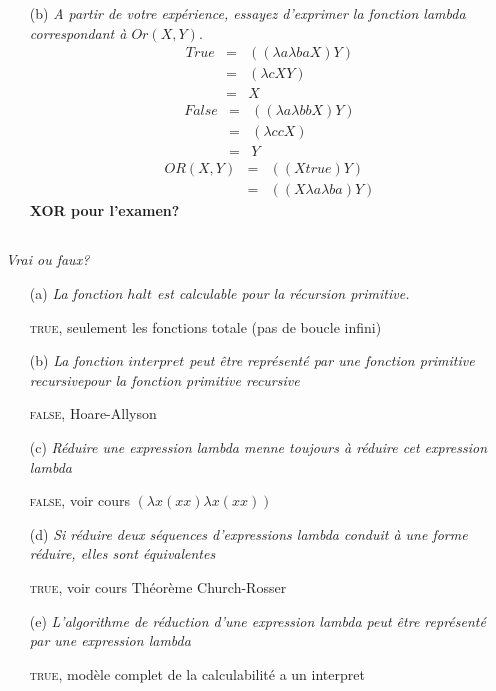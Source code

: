 \begin{itemize}
	\item[(b)]\textit{A partir de votre expérience, essayez d'exprimer la fonction lambda correspondant à $Or(X,Y)$}.
	\begin{eqnarray*}
		True &=& ((\lambda a \lambda ba X)Y)\\
		&=& (\lambda c XY) \\
		&=& X
	\end{eqnarray*}	
	\begin{eqnarray*}
		False &=& ((\lambda a \lambda bb X)Y)\\
		&=& (\lambda cc X) \\
		&=& Y
	\end{eqnarray*}
	\begin{eqnarray*}
		OR(X,Y) &=& ((X true) Y) \\
		&=& ((X \lambda a \lambda ba)Y)
	\end{eqnarray*}
	\textbf{XOR pour l'examen?}
\end{itemize}

\subsection{}

\textit{Vrai ou faux?}
	\begin{itemize}
		\item[(a)] \textit{La fonction $halt$ est calculable pour la récursion primitive.}
		
\textsc{true}, seulement les fonctions totale (pas de boucle infini)

		\item[(b)] \textit{La fonction $interpret$ peut être représenté par une fonction primitive recursivepour la fonction primitive recursive}

\textsc{false}, Hoare-Allyson

		\item[(c)] \textit{Réduire une expression lambda menne toujours à réduire cet expression lambda}

\textsc{false}, voir cours $(\lambda x (xx) \lambda x (xx))$

		\item[(d)] \textit{Si réduire deux séquences d'expressions lambda conduit à une forme réduire, elles sont équivalentes}

\textsc{true}, voir cours Théorème Church-Rosser
	
		\item[(e)] \textit{L'algorithme de réduction d'une expression lambda peut être représenté par une expression lambda}

\textsc{true}, modèle complet de la calculabilité a un interpret
	\end{itemize}
